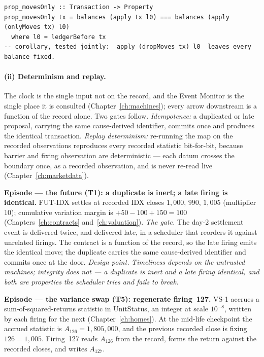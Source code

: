 \begin{lstlisting}
prop_movesOnly :: Transaction -> Property
prop_movesOnly tx = balances (apply tx l0) === balances (apply (onlyMoves tx) l0)
  where l0 = ledgerBefore tx
-- corollary, tested jointly:  apply (dropMoves tx) l0  leaves every balance fixed.
\end{lstlisting}

\paragraph{(ii) Determinism and replay.}
The clock is the single input not on the record, and the Event Monitor is the single place it
is consulted (Chapter~\ref{ch:machines}); every arrow downstream is a function of the record
alone. Two gates follow. \emph{Idempotence:} a duplicated or late proposal, carrying the same
cause-derived identifier, commits once and produces the identical transaction. \emph{Replay
determinism:} re-running the map on the recorded observations reproduces every recorded
statistic bit-for-bit, because barrier and fixing observation are deterministic --- each
datum crosses the boundary once, as a recorded observation, and is never re-read live
(Chapter~\ref{ch:marketdata}).

\medskip\noindent\textbf{Episode --- the future (T1): a duplicate is inert; a late firing is
identical.}
FUT-IDX settles at recorded IDX closes $1{,}000$, $990$, $1{,}005$ (multiplier $10$);
cumulative variation margin is $+50-100+150 = 100$ (Chapters~\ref{ch:contracts}
and~\ref{ch:valuation}). \emph{The gate.} The day-2 settlement event is delivered twice, and
delivered late, in a scheduler that reorders it against unrelated firings. The contract is a
function of the record, so the late firing emits the identical  move; the duplicate
carries the same cause-derived identifier and commits once at the door. \emph{Design point.}
\emph{Timeliness depends on the untrusted machines; integrity does not --- a duplicate is
inert and a late firing identical, and both are properties the scheduler tries and fails to
break.}

\medskip\noindent\textbf{Episode --- the variance swap (T5): regenerate firing~127.}
VS-1 accrues a sum-of-squared-returns statistic in UnitStatus, an integer at scale $10^{-8}$,
written by each firing for the next (Chapter~\ref{ch:homes}). At the mid-life checkpoint the
accrued statistic is $A_{126} = 1{,}805{,}000$, and the previous recorded close is fixing
$126 = 1{,}005$. Firing~127 reads $A_{126}$ from the record, forms the return against the
recorded closes, and writes $A_{127}$.

